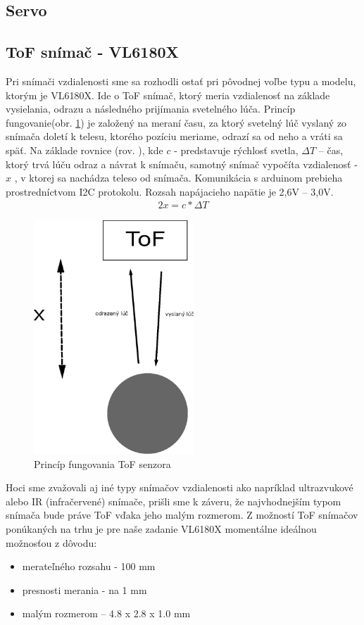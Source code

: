\subsection{Servo}
\label{kap:2.2.1}

\subsection{ToF snímač - VL6180X}
\label{kap:2.2.2}

Pri snímači vzdialenosti sme sa rozhodli ostať pri pôvodnej voľbe typu a modelu, ktorým je VL6180X.
Ide o ToF snímač, ktorý meria vzdialenosť na základe vysielania, odrazu a následného prijímania svetelného lúča. Princíp fungovanie(obr. \ref{OBRAZOK 2.2.2}) je založený na meraní času, za ktorý svetelný lúč vyslaný zo snímača doletí k telesu, ktorého pozíciu meriame, odrazí sa od neho a vráti sa späť. Na základe rovnice (rov. ), kde  \(c\) - predstavuje rýchlosť svetla, \(\Delta T\) – čas, ktorý trvá lúču odraz a návrat k snímaču, samotný snímač vypočíta vzdialenosť - \(x\) , v ktorej sa nachádza teleso od snímača. Komunikácia s arduinom prebieha prostredníctvom I2C protokolu. Rozsah napájacieho napätie je 2,6V – 3,0V. 
\begin{align}
	\label{rovnica.2.1}
	2x = c*\Delta T
\end{align}
\begin{figure}[!h]
	\centering
	\includegraphics[width=60mm]{obr/ToF.eps}
	\caption{Princíp fungovania ToF senzora}\label{OBRAZOK 2.2.2} 
\end{figure} 

Hoci sme zvažovali aj iné typy snímačov vzdialenosti ako napríklad ultrazvukové alebo IR (infračervené) snímače, prišli sme k záveru, že najvhodnejším typom snímača bude práve ToF vďaka jeho malým rozmerom. Z možností ToF snímačov ponúkaných na trhu je pre naše zadanie VL6180X momentálne ideálnou možnosťou z dôvodu:
\begin{itemize}
	\item merateľného rozsahu - 100 mm
	\item presnosti merania - na 1 mm 
	\item malým rozmerom – 4.8 x 2.8 x 1.0 mm
\end{itemize}

